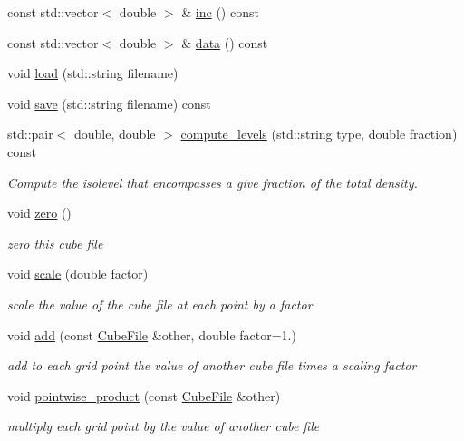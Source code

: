 \begin{DoxyCompactItemize}
\item 
const std\+::vector$<$ double $>$ \& \mbox{\hyperlink{classforte_1_1_cube_file_a9ec8e2d49f08a95023310ec5814d0631}{inc}} () const
\item 
const std\+::vector$<$ double $>$ \& \mbox{\hyperlink{classforte_1_1_cube_file_ac3de35bae3f81d684ce53aced0486e28}{data}} () const
\item 
void \mbox{\hyperlink{classforte_1_1_cube_file_aa1a220dd0dc464118d874004be847138}{load}} (std\+::string filename)
\item 
void \mbox{\hyperlink{classforte_1_1_cube_file_ac45d60ce3490487dd948a4ef9d3d3730}{save}} (std\+::string filename) const
\item 
std\+::pair$<$ double, double $>$ \mbox{\hyperlink{classforte_1_1_cube_file_ae645bcad6dbc72a471f032e436bd21ae}{compute\+\_\+levels}} (std\+::string type, double fraction) const
\begin{DoxyCompactList}\small\item\em Compute the isolevel that encompasses a give fraction of the total density. \end{DoxyCompactList}\item 
void \mbox{\hyperlink{classforte_1_1_cube_file_a1f6886f860b2388a7898d61dc493f58e}{zero}} ()
\begin{DoxyCompactList}\small\item\em zero this cube file \end{DoxyCompactList}\item 
void \mbox{\hyperlink{classforte_1_1_cube_file_af0841a7b1389699679bae67a8027d501}{scale}} (double factor)
\begin{DoxyCompactList}\small\item\em scale the value of the cube file at each point by a factor \end{DoxyCompactList}\item 
void \mbox{\hyperlink{classforte_1_1_cube_file_a79768e0f554988aa44df4136dc6bdf38}{add}} (const \mbox{\hyperlink{classforte_1_1_cube_file}{Cube\+File}} \&other, double factor=1.)
\begin{DoxyCompactList}\small\item\em add to each grid point the value of another cube file times a scaling factor \end{DoxyCompactList}\item 
void \mbox{\hyperlink{classforte_1_1_cube_file_af35406d88fc10f10ed1cf162d395a5f2}{pointwise\+\_\+product}} (const \mbox{\hyperlink{classforte_1_1_cube_file}{Cube\+File}} \&other)
\begin{DoxyCompactList}\small\item\em multiply each grid point by the value of another cube file \end{DoxyCompactList}\end{DoxyCompactItemize}


